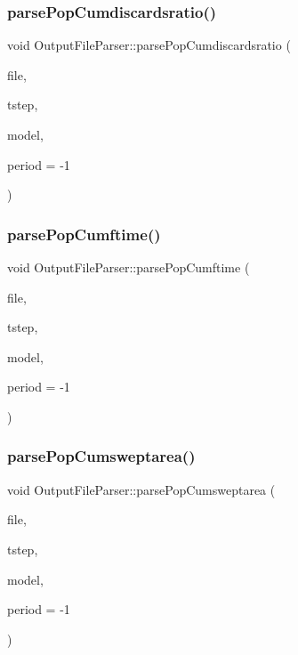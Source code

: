 \subsubsection{\texorpdfstring{parsePopCumdiscardsratio()}{parsePopCumdiscardsratio()}}
{\footnotesize\ttfamily void Output\+File\+Parser\+::parse\+Pop\+Cumdiscardsratio (\begin{DoxyParamCaption}\item[{Q\+File $\ast$}]{file,  }\item[{int}]{tstep,  }\item[{\mbox{\hyperlink{class_displace_model}{Displace\+Model}} $\ast$}]{model,  }\item[{int}]{period = {\ttfamily -\/1} }\end{DoxyParamCaption})\hspace{0.3cm}{\ttfamily [protected]}}

\mbox{\label{class_output_file_parser_ad0612705c50457cd5c6c90718302a251}} 
\subsubsection{\texorpdfstring{parsePopCumftime()}{parsePopCumftime()}}
{\footnotesize\ttfamily void Output\+File\+Parser\+::parse\+Pop\+Cumftime (\begin{DoxyParamCaption}\item[{Q\+File $\ast$}]{file,  }\item[{int}]{tstep,  }\item[{\mbox{\hyperlink{class_displace_model}{Displace\+Model}} $\ast$}]{model,  }\item[{int}]{period = {\ttfamily -\/1} }\end{DoxyParamCaption})\hspace{0.3cm}{\ttfamily [protected]}}

\mbox{\label{class_output_file_parser_a9e29e1e8e2850347b7db4c68c16c8166}} 
\subsubsection{\texorpdfstring{parsePopCumsweptarea()}{parsePopCumsweptarea()}}
{\footnotesize\ttfamily void Output\+File\+Parser\+::parse\+Pop\+Cumsweptarea (\begin{DoxyParamCaption}\item[{Q\+File $\ast$}]{file,  }\item[{int}]{tstep,  }\item[{\mbox{\hyperlink{class_displace_model}{Displace\+Model}} $\ast$}]{model,  }\item[{int}]{period = {\ttfamily -\/1} }\end{DoxyParamCaption})\hspace{0.3cm}{\ttfamily [protected]}}

